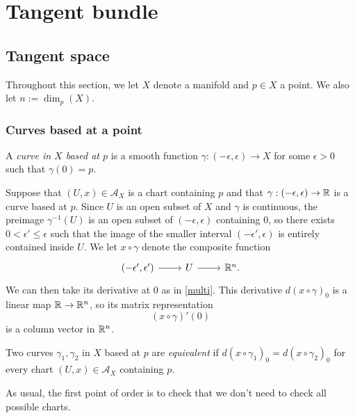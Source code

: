 \chapter{Tangent bundle}


\section{Tangent space}

Throughout this section, we let $X$ denote a manifold and $p \in X$ a point. We also let $n := \dim_p(X)$. 

\subsection{Curves based at a point}

\begin{definition} 
	A \emph{curve in $X$ based at $p$} is a smooth function $\gamma : (-\epsilon, \epsilon) \to X$ for some $\epsilon > 0$ such that $\gamma(0) = p$. 
\end{definition}

Suppose that $(U, x) \in \mathscr{A}_X$ is a chart containing $p$ and that $\gamma : (-\epsilon, \epsilon) \to \mathbb{R}$ is a curve based at $p$. Since $U$ is an open subset of $X$ and $\gamma$ is continuous, the preimage $\gamma^{-1}(U)$ is an open subset of $(-\epsilon, \epsilon)$ containing 0, so there exists $0 < \epsilon' \leq \epsilon$ such that the image of the smaller interval $(-\epsilon', \epsilon)$ is entirely contained inside $U$. We let $x \circ \gamma$ denote the composite function 
\[ \begin{tikzcd} (-\epsilon', \epsilon') \ar{r} & U \ar{r} & \R^n. \end{tikzcd} \]
We can then take its derivative at $0$ as in \cref{multi}. This derivative $d(x \circ \gamma)_0$ is a linear map $\mathbb{R} \to \mathbb{R}^n$, so its matrix representation \[ (x \circ \gamma)'(0) \] is a column vector in $\mathbb{R}^n$.

\begin{definition} \label{equivalent-curves} 
	Two curves $\gamma_1, \gamma_2$ in $X$ based at $p$ are \emph{equivalent} if $d(x \circ \gamma_1)_0 = d(x \circ \gamma_2)_0$ for every chart $(U, x) \in \mathscr{A}_X$ containing $p$. 
\end{definition}

As usual, the first point of order is to check that we don't need to check all possible charts. 

